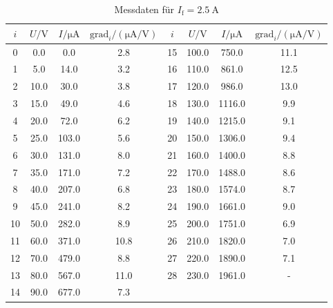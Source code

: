 \begin{table}[h]
    \centering
    \begin{tabular}{S[table-format=:.0] S S S S[table-format=:.0] S S S}
        \toprule
        {$i$} &
        {$U / \unit{\volt}$} &
        {$I/ \unit{\micro\ampere}$} &
        {$\text{grad}_i/ (\unit{\micro\ampere\per\volt})$} &
        {$i$} &
        {$U / \unit{\volt}$} &
        {$I/ \unit{\micro\ampere}$} &
        {$\text{grad}_i/ (\unit{\micro\ampere\per\volt})$} \\
            & 0.0      & 0.0       & 2.8   &        15   & 100.0    & 750.0     & 11.1   \\
        1    & 5.0      & 14.0      & 3.2   &        16   & 110.0    & 861.0     & 12.5   \\
        2    & 10.0     & 30.0      & 3.8   &        17   & 120.0    & 986.0     & 13.0   \\
        3    & 15.0     & 49.0      & 4.6   &        18   & 130.0    & 1116.0    & 9.9    \\
        4    & 20.0     & 72.0      & 6.2   &        19   & 140.0    & 1215.0    & 9.1    \\
        5    & 25.0     & 103.0     & 5.6   &        20   & 150.0    & 1306.0    & 9.4    \\
        6    & 30.0     & 131.0     & 8.0   &        21   & 160.0    & 1400.0    & 8.8    \\
        7    & 35.0     & 171.0     & 7.2   &        22   & 170.0    & 1488.0    & 8.6    \\
        8    & 40.0     & 207.0     & 6.8   &        23   & 180.0    & 1574.0    & 8.7    \\
        9    & 45.0     & 241.0     & 8.2   &        24   & 190.0    & 1661.0    & 9.0    \\
        10   & 50.0     & 282.0     & 8.9   &        25   & 200.0    & 1751.0    & 6.9    \\
        11   & 60.0     & 371.0     & 10.8  &        26   & 210.0    & 1820.0    & 7.0    \\
        12   & 70.0     & 479.0     & 8.8   &        27   & 220.0    & 1890.0    & 7.1    \\
        13   & 80.0     & 567.0     & 11.0  &        28   & 230.0    & 1961.0    & {-}    \\
        14   & 90.0     & 677.0     & 7.3   & & & & \\

        \bottomrule
    \end{tabular}
    \caption{Messdaten für $I_\text{f}= \qty{2.5}{\ampere}$}
    \label{tab:c03}
\end{table}